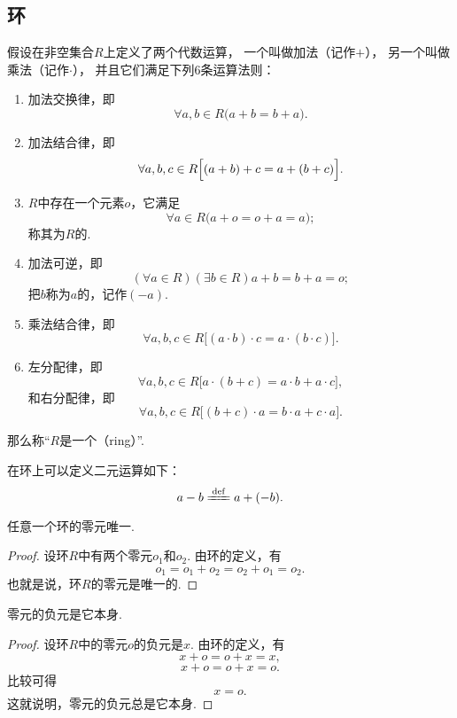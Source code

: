 \subsection{环}
\begin{definition}
假设在非空集合\(R\)上定义了两个代数运算，
一个叫做加法（记作\(+\)），
另一个叫做乘法（记作\(\cdot\)），
并且它们满足下列6条运算法则：
\begin{enumerate}
    \item 加法交换律，即\[
        \forall a,b \in R \bigl(a+b = b+a\bigr).
    \]

    \item 加法结合律，即\[
        \forall a,b,c \in R \Bigl[(a+b)+c = a+(b+c)\Bigr].
    \]

    \item \(R\)中存在一个元素\(o\)，它满足\[
        \forall a \in R \bigl( a+o = o+a = a \bigr);
    \]
    称其为\(R\)的.

    \item 加法可逆，即\[
        (\forall a \in R)(\exists b \in R)
        a+b = b+a = o;
    \]
    把\(b\)称为\(a\)的，记作\((-a)\).

    \item 乘法结合律，即\[
        \forall a,b,c \in R
        \bigl[ (a \cdot b) \cdot c = a \cdot (b \cdot c) \bigr].
    \]

    \item 左分配律，即\[
        \forall a,b,c \in R \bigl[ a \cdot (b+c) = a \cdot b + a \cdot c \bigr],
    \]
    和右分配律，即\[
        \forall a,b,c \in R \bigl[ (b+c) \cdot a = b \cdot a + c \cdot a \bigr].
    \]
\end{enumerate}
那么称“\(R\)是一个（ring）”.
\end{definition}

在环上可以定义二元运算如下：\[
    a - b \defeq a + (-b).
\]

\begin{property}
任意一个环的零元唯一.
\begin{proof}
设环\(R\)中有两个零元\(o_1\)和\(o_2\).
由环的定义，有\[
    o_1 = o_1 + o_2 = o_2 + o_1 = o_2.
\]
也就是说，环\(R\)的零元是唯一的.
\end{proof}
\end{property}

\begin{property}
零元的负元是它本身.
\begin{proof}
设环\(R\)中的零元\(o\)的负元是\(x\).
由环的定义，有\[
    x + o = o + x = x,
\]\[
    x + o = o + x = o.
\]比较可得\[
    x = o.
\]
这就说明，零元的负元总是它本身.
\end{proof}
\end{property}

